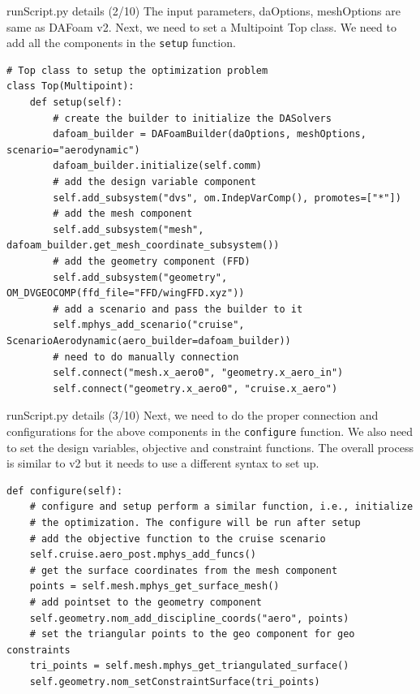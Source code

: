 \documentclass{bredelebeamer}
\begin{document}
\begin{frame}[fragile]{runScript.py details (2/10)}
  The input parameters, daOptions, meshOptions are same as DAFoam v2. Next, we need to set a Multipoint Top class. We need to add all the components in the \texttt{setup} function.
  \footnotesize
  \lstset{ language=bash }
  \begin{lstlisting}
# Top class to setup the optimization problem
class Top(Multipoint):
    def setup(self):
        # create the builder to initialize the DASolvers
        dafoam_builder = DAFoamBuilder(daOptions, meshOptions, scenario="aerodynamic")
        dafoam_builder.initialize(self.comm)
        # add the design variable component 
        self.add_subsystem("dvs", om.IndepVarComp(), promotes=["*"])
        # add the mesh component
        self.add_subsystem("mesh", dafoam_builder.get_mesh_coordinate_subsystem())
        # add the geometry component (FFD)
        self.add_subsystem("geometry", OM_DVGEOCOMP(ffd_file="FFD/wingFFD.xyz"))
        # add a scenario and pass the builder to it
        self.mphys_add_scenario("cruise", ScenarioAerodynamic(aero_builder=dafoam_builder))
        # need to do manually connection
        self.connect("mesh.x_aero0", "geometry.x_aero_in")
        self.connect("geometry.x_aero0", "cruise.x_aero")
  \end{lstlisting}
  \normalsize
  \end{frame}

\begin{frame}[fragile]{runScript.py details (3/10)}
Next, we need to do the proper connection and configurations for the above components in the \texttt{configure} function. We also need to set the design variables, objective and constraint functions. The overall process is similar to v2 but it needs to use a different syntax to set up.
    \footnotesize
    \lstset{ language=bash }
    \begin{lstlisting}
def configure(self):
    # configure and setup perform a similar function, i.e., initialize 
    # the optimization. The configure will be run after setup
    # add the objective function to the cruise scenario
    self.cruise.aero_post.mphys_add_funcs()
    # get the surface coordinates from the mesh component
    points = self.mesh.mphys_get_surface_mesh()
    # add pointset to the geometry component
    self.geometry.nom_add_discipline_coords("aero", points)
    # set the triangular points to the geo component for geo constraints
    tri_points = self.mesh.mphys_get_triangulated_surface()
    self.geometry.nom_setConstraintSurface(tri_points)
  \end{lstlisting}
  \normalsize
  \end{frame}
\end{document}
